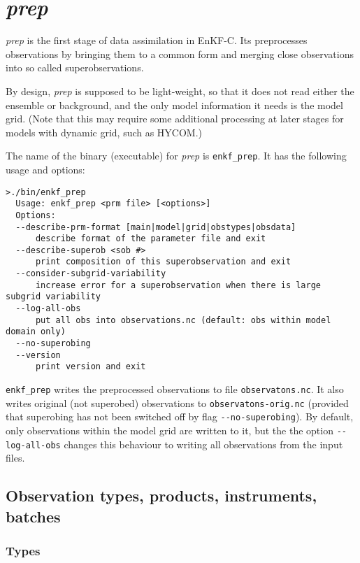 \documentclass[11pt]{report}
\begin{document}
\section{\emph{prep}}

\emph{prep} is the first stage of data assimilation in EnKF-C.
Its preprocesses observations by bringing them to a common form and merging close observations into so called superobservations.

By design, \emph{prep} is supposed to be light-weight, so that it does not read either the ensemble or background, and the only model information it needs is the model grid. 
(Note that this may require some additional processing at later stages for models with dynamic grid, such as HYCOM.)

The name of the binary (executable) for \emph{prep} is \verb|enkf_prep|.
It has the following usage and options:
\begin{Verbatim}[frame=single,fontsize=\footnotesize]
>./bin/enkf_prep
  Usage: enkf_prep <prm file> [<options>]
  Options:
  --describe-prm-format [main|model|grid|obstypes|obsdata]
      describe format of the parameter file and exit
  --describe-superob <sob #>
      print composition of this superobservation and exit
  --consider-subgrid-variability
      increase error for a superobservation when there is large subgrid variability
  --log-all-obs
      put all obs into observations.nc (default: obs within model domain only)
  --no-superobing
  --version
      print version and exit
\end{Verbatim}

\verb|enkf_prep| writes the preprocessed observations to file \verb|observatons.nc|.
It also writes original (not superobed) observations to \verb|observatons-orig.nc| (provided that superobing has not been switched off by flag \verb|--no-superobing|).
By default, only observations within the model grid are written to it, but the the option \verb|--log-all-obs| changes this behaviour to writing all observations from the input files.

\subsection{Observation types, products, instruments, batches}

\subsubsection{Types}
\label{sec:types}
\end{document}
